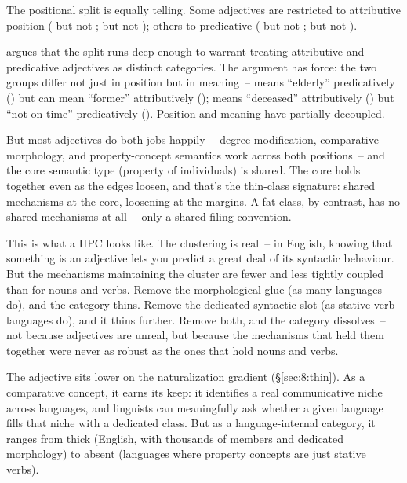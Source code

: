 The positional split is equally telling. Some adjectives are restricted to attributive position ( but not ;  but not ); others to predicative ( but not ;  but not ).

\textcite{matthews2014} argues that the split runs deep enough to warrant treating attributive and predicative adjectives as distinct categories. The argument has force: the two groups differ not just in position but in meaning~--  means \enquote{elderly} predicatively () but can mean \enquote{former} attributively ();  means \enquote{deceased} attributively () but \enquote{not on time} predicatively (). Position and meaning have partially decoupled.

But most adjectives do both jobs happily~-- degree modification, comparative morphology, and property-concept semantics work across both positions~-- and the core semantic type (property of individuals) is shared. The core holds together even as the edges loosen, and that's the thin-class signature: shared mechanisms at the core, loosening at the margins. A fat class, by contrast, has no shared mechanisms at all~-- only a shared filing convention.

This is what a  HPC looks like. The clustering is real~-- in English, knowing that something is an adjective lets you predict a great deal of its syntactic behaviour. But the mechanisms maintaining the cluster are fewer and less tightly coupled than for nouns and verbs. Remove the morphological glue (as many languages do), and the category thins. Remove the dedicated syntactic slot (as stative-verb languages do), and it thins further. Remove both, and the category dissolves~-- not because adjectives are unreal, but because the mechanisms that held them together were never as robust as the ones that hold nouns and verbs.

The adjective sits lower on the naturalization gradient (§\ref{sec:8:thin}). As a comparative concept, it earns its keep: it identifies a real communicative niche across languages, and linguists can meaningfully ask whether a given language fills that niche with a dedicated class. But as a language-internal category, it ranges from thick (English, with thousands of members and dedicated morphology) to absent (languages where property concepts are just stative verbs).

